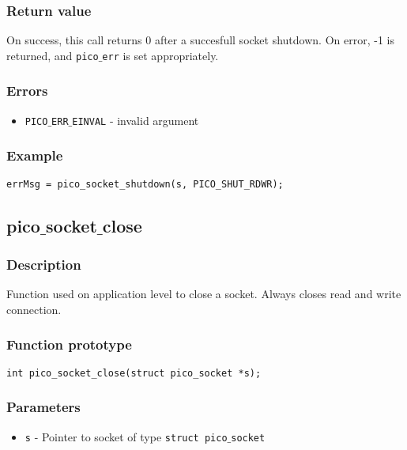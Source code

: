 \subsubsection*{Return value}
On success, this call returns 0 after a succesfull socket shutdown.
On error, -1 is returned, and \texttt{pico$\_$err} is set appropriately.

\subsubsection*{Errors}
\begin{itemize}[noitemsep]
\item \texttt{PICO$\_$ERR$\_$EINVAL} - invalid argument
\end{itemize}

\subsubsection*{Example}
\begin{verbatim}
errMsg = pico_socket_shutdown(s, PICO_SHUT_RDWR);
\end{verbatim}


\subsection{pico$\_$socket$\_$close}

\subsubsection*{Description}
Function used on application level to close a socket. Always closes read and write connection.

\subsubsection*{Function prototype}
\begin{verbatim}
int pico_socket_close(struct pico_socket *s);
\end{verbatim}

\subsubsection*{Parameters}
\begin{itemize}[noitemsep]
\item \texttt{s} - Pointer to socket of type \texttt{struct pico$\_$socket}
\end{itemize}

